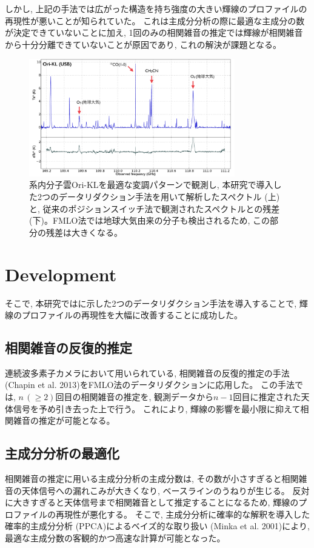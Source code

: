 \documentclass[a4paper,10pt,oneside,twocolumn,notitlepage,final]{jarticle}
\begin{document}
しかし, 上記の手法では広がった構造を持ち強度の大きい輝線のプロファイルの再現性が悪いことが知られていた。
これは主成分分析の際に最適な主成分の数が決定できていないことに加え, 1回のみの相関雑音の推定では輝線が相関雑音から十分分離できていないことが原因であり, これの解決が課題となる。
\begin{figure}[!ht]
    \centering
    \includegraphics[width=0.8\textwidth]{fig/spec.pdf}
    \caption{系内分子雲Ori-KLを最適な変調パターンで観測し, 本研究で導入した2つのデータリダクション手法を用いて解析したスペクトル (上)と, 従来のポジションスイッチ法で観測されたスペクトルとの残差 (下)。FMLO法では地球大気由来の分子も検出されるため, この部分の残差は大きくなる。}
    \label{spec}
\end{figure}

\section{Development}
そこで, 本研究ではに示した2つのデータリダクション手法を導入することで, 輝線のプロファイルの再現性を大幅に改善することに成功した。

\vspace{-5mm}
\subsection{相関雑音の反復的推定}
連続波多素子カメラにおいて用いられている, 相関雑音の反復的推定の手法 (Chapin et al. 2013)をFMLO法のデータリダクションに応用した。
この手法では, $n\,(\geq2)$回目の相関雑音の推定を, 観測データから$n-1$回目に推定された天体信号を予め引き去った上で行う。
これにより, 輝線の影響を最小限に抑えて相関雑音の推定が可能となる。

\vspace{-5mm}
\subsection{主成分分析の最適化}
相関雑音の推定に用いる主成分分析の主成分数は, その数が小さすぎると相関雑音の天体信号への漏れこみが大きくなり, ベースラインのうねりが生じる。
反対に大きすぎると天体信号まで相関雑音として推定することになるため, 輝線のプロファイルの再現性が悪化する。
そこで, 主成分分析に確率的な解釈を導入した確率的主成分分析 (PPCA)によるベイズ的な取り扱い (Minka et al. 2001)により,
最適な主成分数の客観的かつ高速な計算が可能となった。
\end{document}
